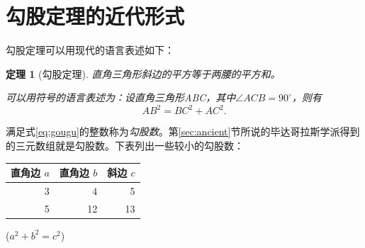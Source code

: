 \documentclass[UTF8] {ctexart}
\newcommand\degree{^\circ}           %
\begin{document}
\section{勾股定理的近代形式}
勾股定理可以用现代的语言表述如下：
\newtheorem{thm}{定理}
\begin{thm}[勾股定理]
    直角三角形斜边的平方等于两腰的平方和。

可以用符号的语言表述为：设直角三角形ABC，其中$\angle ACB = 90\degree$，则有
\begin{equation}\label{eq:gougu}
    AB^2 = BC^2 + AC^2.
\end{equation}
\end{thm}
满足式\eqref{eq:gougu}的整数称为\emph{勾股数}。第\ref{sec:ancient}节所说的毕达哥拉斯学派得到的三元数组就是勾股数。下表列出一些较小的勾股数：
\begin{table}[H]   %

\begin{tabular}{|rrr|}  %
\hline  %
直角边 $a$ & 直角边 $b$ & 斜边 $c$ \\   %
\hline
3 &  4 &  5 \\
5 & 12 & 13 \\
\hline
\end{tabular}%
\qquad  %
($a^2 + b^2 = c^2$)
\end{table}

\nocite{Shiye}      %
\end{document}
